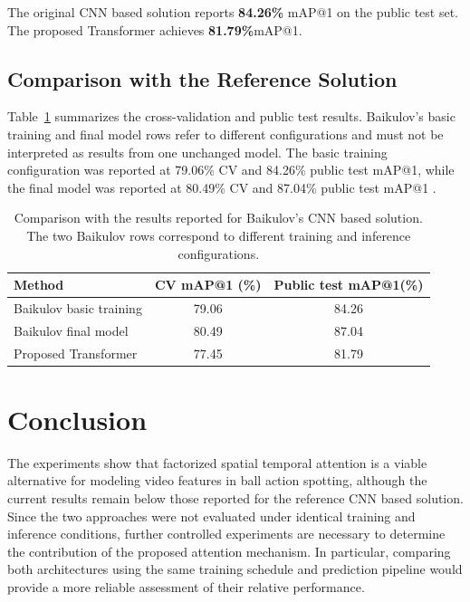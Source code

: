 \documentclass[conference]{IEEEtran}
\begin{document}
The original CNN based solution reports \textbf{84.26\%} mAP@1 on the public test set. The proposed Transformer achieves \textbf{ 81.79\%}mAP@1.

\subsection{Comparison with the Reference Solution}
Table~\ref{table:comparison} summarizes the cross-validation and public test results. Baikulov's basic training and final model rows refer to different configurations and must not be interpreted as results from one unchanged model. The basic training configuration was reported at 79.06\% CV and 84.26\% public test mAP@1, while the final model was reported at 80.49\% CV and 87.04\% public test mAP@1 \cite{Baikulov2023}.

\begin{table}[t]
\caption{Comparison with the results reported for Baikulov's CNN based solution. The two Baikulov rows correspond to different training and inference configurations.}
\label{table:comparison}
\centering
\small
\begin{tabularx}{\linewidth}{lcc}
\toprule
Method&CV mAP@1 (\%)&Public test mAP@1(\%)\\
\midrule
Baikulov basic training & 79.06 & 84.26\\
Baikulov final model & 80.49 & 87.04\\
Proposed Transformer & 77.45 & 81.79\\
\bottomrule
\end{tabularx}
\end{table}

\section{Conclusion}
The experiments show that factorized spatial temporal attention is a viable alternative for modeling video features in ball action spotting, although the current results remain below those reported for the reference CNN based solution. Since the two approaches were not evaluated under identical training and inference conditions, further controlled experiments are necessary to determine the contribution of the proposed attention mechanism. In particular, comparing both architectures using the same training schedule and prediction pipeline would provide a more reliable assessment of their relative performance.

{}


\vspace{12pt}
\end{document}
